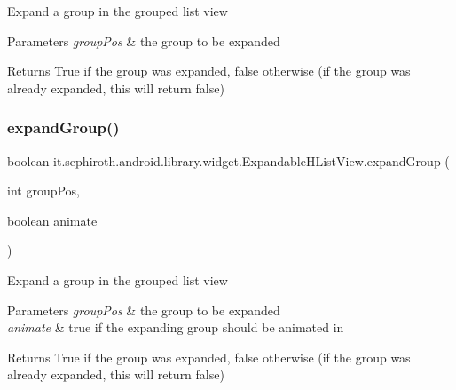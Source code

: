 Expand a group in the grouped list view


\begin{DoxyParams}{Parameters}
{\em group\+Pos} & the group to be expanded \\
\hline
\end{DoxyParams}
\begin{DoxyReturn}{Returns}
True if the group was expanded, false otherwise (if the group was already expanded, this will return false) 
\end{DoxyReturn}
\mbox{\label{classit_1_1sephiroth_1_1android_1_1library_1_1widget_1_1_expandable_h_list_view_a22d2e38f6785fa7a0857cc571e908b84}} 
\subsubsection{\texorpdfstring{expand\+Group()}{expandGroup()}\hspace{0.1cm}{\footnotesize\ttfamily [2/2]}}
{\footnotesize\ttfamily boolean it.\+sephiroth.\+android.\+library.\+widget.\+Expandable\+H\+List\+View.\+expand\+Group (\begin{DoxyParamCaption}\item[{int}]{group\+Pos,  }\item[{boolean}]{animate }\end{DoxyParamCaption})}

Expand a group in the grouped list view


\begin{DoxyParams}{Parameters}
{\em group\+Pos} & the group to be expanded \\
\hline
{\em animate} & true if the expanding group should be animated in \\
\hline
\end{DoxyParams}
\begin{DoxyReturn}{Returns}
True if the group was expanded, false otherwise (if the group was already expanded, this will return false) 
\end{DoxyReturn}
\mbox{\label{classit_1_1sephiroth_1_1android_1_1library_1_1widget_1_1_expandable_h_list_view_af493a74c7e6c321450f767673d449849}} 
